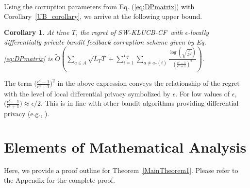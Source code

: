\documentclass[letterpaper]{article} %
\newcommand{\SWKLUCBCF}{\textsc{SW-KLUCB-CF}}
\newcommand{\optArmAtIChanges}[1]{a_{*}(#1)}
\newcommand{\numChanges}{L}
\newcounter{counterCorollary}
\newtheorem{myCorollary}[counterCorollary]{Corollary}
\begin{document}
\textbf{} Using the corruption parameters from Eq. (\ref{eq:DPmatrix}) with  Corollary~\ref{UB_corollary}, we arrive  at the following upper bound.
\begin{myCorollary}
\label{DPUB_corollary}At time $T$,
the regret of \SWKLUCBCF \  with $\epsilon$-locally differentially private bandit feedback corruption scheme given by Eq. \eqref{eq:DPmatrix} is
$
\tilde{O}\left( \sum_{a \in A} \sqrt{\numChanges_T T} + \sum_{i=1}^{\numChanges_T} \sum_{a \neq \optArmAtIChanges{i}} \frac{\log{\left(  \sqrt{ \frac{T}{\numChanges_T}} \right)}}{\left( \frac{e^\epsilon - 1}{e^\epsilon + 1}\right)^2} \right).
$
\end{myCorollary}  The term $\big( \frac{e^\epsilon - 1}{e^\epsilon + 1}\big)^2$ in the above expression conveys the relationship of the regret with the level of local differential privacy symbolized by $\epsilon$. For low values of $\epsilon$,  $ \big( \frac{e^\epsilon - 1}{e^\epsilon + 1}\big) \approx \epsilon / 2 $. This is in line with other bandit algorithms providing differential privacy (e.g., \citet{DBLP:conf/uai/MishraT15}).

\section{Elements of Mathematical Analysis}
Here, we provide a proof outline for Theorem~\ref{MainTheorem1}. Please refer to the Appendix for the complete proof.
\end{document}
